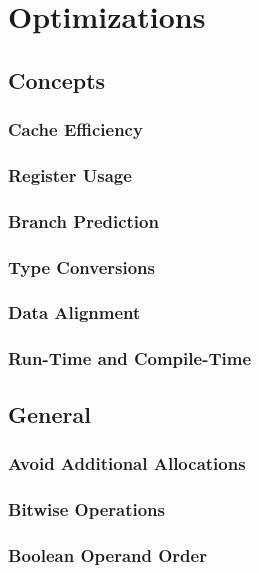 \section{Optimizations}

\subsection{Concepts}

\subsubsection{Cache Efficiency}

\subsubsection{Register Usage}

\subsubsection{Branch Prediction}

\subsubsection{Type Conversions}

\subsubsection{Data Alignment}

\subsubsection{Run-Time and Compile-Time}

\subsection{General}

\subsubsection{Avoid Additional Allocations}

\subsubsection{Bitwise Operations}

\subsubsection{Boolean Operand Order}

